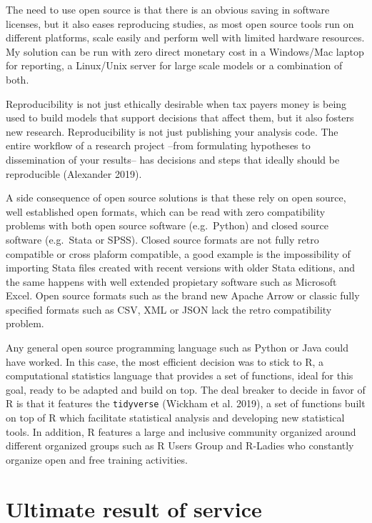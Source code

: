 \documentclass[12pt,reqno,oneside,pdftex]{formato-puc/puctesis} %
\begin{document}
The need to use open source is that there is an obvious saving in
software licenses, but it also eases reproducing studies, as most open
source tools run on different platforms, scale easily and perform well
with limited hardware resources. My solution can be run with zero direct
monetary cost in a Windows/Mac laptop for reporting, a Linux/Unix server
for large scale models or a combination of both.

Reproducibility is not just ethically desirable when tax payers money is
being used to build models that support decisions that affect them, but
it also fosters new research. Reproducibility is not just publishing
your analysis code. The entire workflow of a research project --from
formulating hypotheses to dissemination of your results-- has decisions
and steps that ideally should be reproducible (Alexander 2019).

A side consequence of open source solutions is that these rely on open
source, well established open formats, which can be read with zero
compatibility problems with both open source software (e.g.~Python) and
closed source software (e.g.~Stata or SPSS). Closed source formats are
not fully retro compatible or cross plaform compatible, a good example
is the impossibility of importing Stata files created with recent
versions with older Stata editions, and the same happens with well
extended propietary software such as Microsoft Excel. Open source
formats such as the brand new Apache Arrow or classic fully specified
formats such as CSV, XML or JSON lack the retro compatibility problem.

Any general open source programming language such as Python or Java
could have worked. In this case, the most efficient decision was to
stick to R, a computational statistics language that provides a set of
functions, ideal for this goal, ready to be adapted and build on top.
The deal breaker to decide in favor of R is that it features the
\texttt{tidyverse} (Wickham et al. 2019), a set of functions built on
top of R which facilitate statistical analysis and developing new
statistical tools. In addition, R features a large and inclusive
community organized around different organized groups such as R Users
Group and R-Ladies who constantly organize open and free training
activities.

\hypertarget{ultimate-result-of-service}{%
\section{Ultimate result of service}\label{ultimate-result-of-service}}
\end{document}
